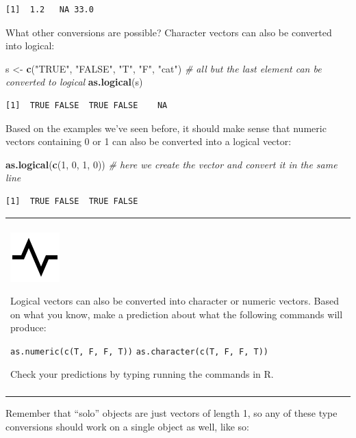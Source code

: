 \documentclass[
]{book}
\newenvironment{Shaded}{\begin{snugshade}}{\end{snugshade}}
\newcommand{\CommentTok}[1]{\textcolor[rgb]{0.56,0.35,0.01}{\textit{#1}}}
\newcommand{\DecValTok}[1]{\textcolor[rgb]{0.00,0.00,0.81}{#1}}
\newcommand{\KeywordTok}[1]{\textcolor[rgb]{0.13,0.29,0.53}{\textbf{#1}}}
\newcommand{\NormalTok}[1]{#1}
\newcommand{\StringTok}[1]{\textcolor[rgb]{0.31,0.60,0.02}{#1}}
\newenvironment{progress}
{
  \begin{center}
  \begin{tabular}{|>{\columncolor{progress}}p{0.9\textwidth}|}
  \hline\\
  \includegraphics[scale=0.1]{src/images/pulse-line.png}
}
{\\\\\hline
  \end{tabular}
  \end{center}
}
\begin{document}
\begin{verbatim}
[1]  1.2   NA 33.0
\end{verbatim}

What other conversions are possible?
Character vectors can also be converted into logical:

\begin{Shaded}
\begin{Highlighting}[]
\NormalTok{s <-}\StringTok{ }\KeywordTok{c}\NormalTok{(}\StringTok{"TRUE"}\NormalTok{, }\StringTok{"FALSE"}\NormalTok{, }\StringTok{"T"}\NormalTok{, }\StringTok{"F"}\NormalTok{, }\StringTok{"cat"}\NormalTok{)   }\CommentTok{# all but the last element can be converted to logical}
\KeywordTok{as.logical}\NormalTok{(s)}
\end{Highlighting}
\end{Shaded}

\begin{verbatim}
[1]  TRUE FALSE  TRUE FALSE    NA
\end{verbatim}

Based on the examples we've seen before, it should make sense that numeric vectors containing 0 or 1 can also be converted into a logical vector:

\begin{Shaded}
\begin{Highlighting}[]
\KeywordTok{as.logical}\NormalTok{(}\KeywordTok{c}\NormalTok{(}\DecValTok{1}\NormalTok{, }\DecValTok{0}\NormalTok{, }\DecValTok{1}\NormalTok{, }\DecValTok{0}\NormalTok{))  }\CommentTok{# here we create the vector and convert it in the same line}
\end{Highlighting}
\end{Shaded}

\begin{verbatim}
[1]  TRUE FALSE  TRUE FALSE
\end{verbatim}

\begin{progress}
Logical vectors can also be converted into character or numeric vectors.
Based on what you know, make a prediction about what the following
commands will produce:

\texttt{as.numeric(c(T,\ F,\ F,\ T))}
\texttt{as.character(c(T,\ F,\ F,\ T))}

Check your predictions by typing running the commands in R.
\end{progress}

Remember that ``solo'' objects are just vectors of length 1, so any of these type conversions should work on a single object as well, like so:
\end{document}
